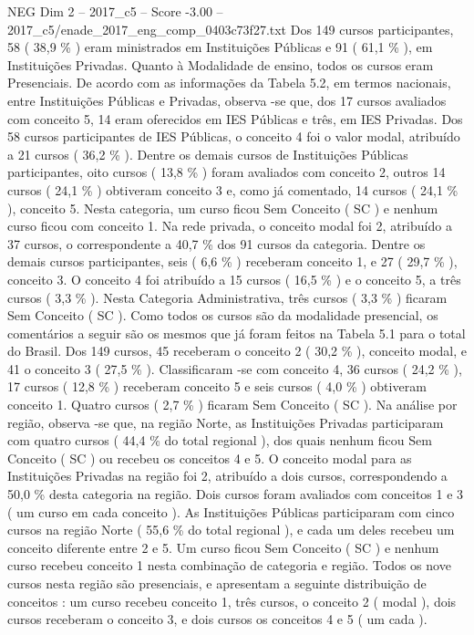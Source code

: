 \begin{textsample}{NEG Dim 2 – 2017\_c5 – Score -3.00 – 2017\_c5/enade\_2017\_eng\_comp\_0403c73f27.txt}
Dos 149 cursos participantes, 58 ( 38,9 \% ) eram ministrados em Instituições Públicas e 91 ( 61,1 \% ), em Instituições Privadas.
Quanto à Modalidade de ensino, todos os cursos eram Presenciais.
De acordo com as informações da Tabela 5.2, em termos nacionais, entre Instituições Públicas e Privadas, observa -se que, dos 17 cursos avaliados com conceito 5, 14 eram oferecidos em IES Públicas e três, em IES Privadas.
Dos 58 cursos participantes de IES Públicas, o conceito 4 foi o valor modal, atribuído a 21 cursos ( 36,2 \% ).
Dentre os demais cursos de Instituições Públicas participantes, oito cursos ( 13,8 \% ) foram avaliados com conceito 2, outros 14 cursos ( 24,1 \% ) obtiveram conceito 3 e, como já comentado, 14 cursos ( 24,1 \% ), conceito 5.
Nesta categoria, um curso ficou Sem Conceito ( SC ) e nenhum curso ficou com conceito 1.
Na rede privada, o conceito modal foi 2, atribuído a 37 cursos, o correspondente a 40,7 \% dos 91 cursos da categoria.
Dentre os demais cursos participantes, seis ( 6,6 \% ) receberam conceito 1, e 27 ( 29,7 \% ), conceito 3.
O conceito 4 foi atribuído a 15 cursos ( 16,5 \% ) e o conceito 5, a três cursos ( 3,3 \% ).
Nesta Categoria Administrativa, três cursos ( 3,3 \% ) ficaram Sem Conceito ( SC ).
Como todos os cursos são da modalidade presencial, os comentários a seguir são os mesmos que já foram feitos na Tabela 5.1 para o total do Brasil.
Dos 149 cursos, 45 receberam o conceito 2 ( 30,2 \% ), conceito modal, e 41 o conceito 3 ( 27,5 \% ).
Classificaram -se com conceito 4, 36 cursos ( 24,2 \% ), 17 cursos ( 12,8 \% ) receberam conceito 5 e seis cursos ( 4,0 \% ) obtiveram conceito 1.
Quatro cursos ( 2,7 \% ) ficaram Sem Conceito ( SC ).
Na análise por região, observa -se que, na região Norte, as Instituições Privadas participaram com quatro cursos ( 44,4 \% do total regional ), dos quais nenhum ficou Sem Conceito ( SC ) ou recebeu os conceitos 4 e 5.
O conceito modal para as Instituições Privadas na região foi 2, atribuído a dois cursos, correspondendo a 50,0 \% desta categoria na região.
Dois cursos foram avaliados com conceitos 1 e 3 ( um curso em cada conceito ).
As Instituições Públicas participaram com cinco cursos na região Norte ( 55,6 \% do total regional ), e cada um deles recebeu um conceito diferente entre 2 e 5.
Um curso ficou Sem Conceito ( SC ) e nenhum curso recebeu conceito 1 nesta combinação de categoria e região.
Todos os nove cursos nesta região são presenciais, e apresentam a seguinte distribuição de conceitos : um curso recebeu conceito 1, três cursos, o conceito 2 ( modal ), dois cursos receberam o conceito 3, e dois cursos os conceitos 4 e 5 ( um cada ).

\end{textsample}
